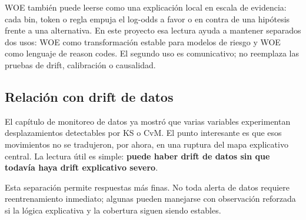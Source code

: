 \documentclass[
  spanish,
  11pt,
  letterpaper,
]{scrbook}
\theoremstyle{plain}
\theoremstyle{remark}
\begin{document}
\begin{tcolorbox}[enhanced jigsaw, arc=.35mm, bottomrule=.15mm, bottomtitle=1mm, breakable, colback=white, colbacktitle=quarto-callout-note-color!10!white, colframe=quarto-callout-note-color-frame, coltitle=black, left=2mm, leftrule=.75mm, opacityback=0, opacitybacktitle=0.6, rightrule=.15mm, title=\textcolor{quarto-callout-note-color}{\faInfo}\hspace{0.5em}{WOE como explicación contrastiva}, titlerule=0mm, toprule=.15mm, toptitle=1mm]

WOE también puede leerse como una explicación local en escala de
evidencia: cada bin, token o regla empuja el log-odds a favor o en
contra de una hipótesis frente a una alternativa. En este proyecto esa
lectura ayuda a mantener separados dos usos: WOE como transformación
estable para modelos de riesgo y WOE como lenguaje de reason codes. El
segundo uso es comunicativo; no reemplaza las pruebas de drift,
calibración o causalidad.

\end{tcolorbox}

\subsection{Relación con drift de
datos}\label{relaciuxf3n-con-drift-de-datos}

El capítulo de monitoreo de datos ya mostró que varias variables
experimentan desplazamientos detectables por KS o CvM. El punto
interesante es que esos movimientos no se tradujeron, por ahora, en una
ruptura del mapa explicativo central. La lectura útil es simple:
\textbf{puede haber drift de datos sin que todavía haya drift
explicativo severo}.

Esta separación permite respuestas más finas. No toda alerta de datos
requiere reentrenamiento inmediato; algunas pueden manejarse con
observación reforzada si la lógica explicativa y la cobertura siguen
siendo estables.
\end{document}
